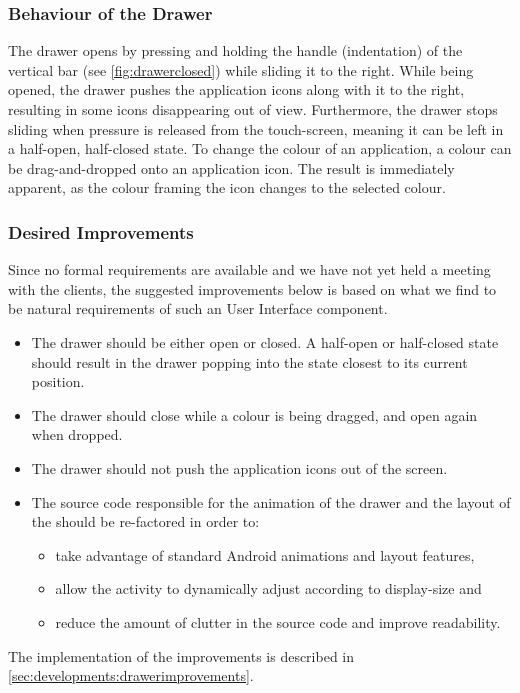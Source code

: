 \subsubsection{Behaviour of the Drawer}\label{sec:drawer:behaviour}
The drawer opens by pressing and holding the handle (indentation) of the vertical bar (see \cref{fig:drawerclosed}) while sliding it to the right.
While being opened, the drawer pushes the application icons along with it to the right, resulting in some icons disappearing out of view.
Furthermore, the drawer stops sliding when pressure is released from the touch-screen, meaning it can be left in a half-open, half-closed state.
To change the colour of an application, a colour can be drag-and-dropped onto an application icon. 
The result is immediately apparent, as the colour framing the icon changes to the selected colour.

\subsubsection{Desired Improvements}
Since no formal requirements are available and we have not yet held a meeting with the clients, the suggested improvements below is based on what we find to be natural requirements of such an User Interface component. 

\begin{itemize}
\item The drawer should be either open or closed. A half-open or half-closed state should result in the drawer popping into the state closest to its current position.
\item The drawer should close while a colour is being dragged, and open again when dropped.
\item The drawer should not push the application icons out of the screen.
\item The source code responsible for the animation of the drawer and the layout of the \homeactivity should be re-factored in order to:
	\begin{itemize}
	\item take advantage of standard Android animations and layout features,
	\item allow the activity to dynamically adjust according to display-size and
	\item reduce the amount of clutter in the source code and improve readability.
	\end{itemize}
\end{itemize}

The implementation of the improvements is described in \cref{sec:developments:drawerimprovements}.